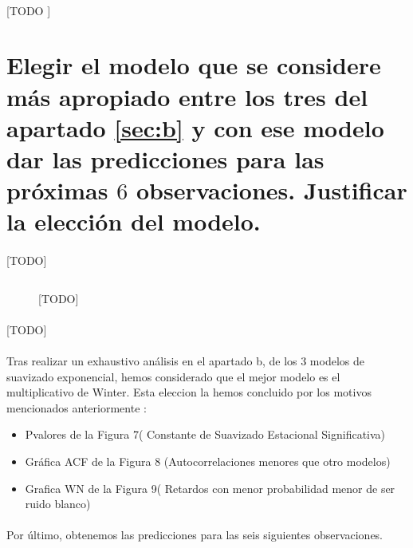 \documentclass[a4paper, spanish]{article}
\begin{document}
    \paragraph{}
    [TODO ]

  \section{Elegir el modelo que se considere más apropiado entre los tres del apartado \ref{sec:b} y con ese modelo dar las predicciones para las próximas $6$ observaciones. Justificar la elección del modelo.}
  \label{sec:c}

    \paragraph{}
    [TODO]

    \begin{figure}[h]
      \centering
      \inputminted{SAS}{./res/code/c-01-prediction.sas}
      \caption{[TODO]}
      \label{code:c_prediction}
    \end{figure}

    \paragraph{}
    [TODO]

    \paragraph{}
    Tras realizar un exhaustivo análisis en el apartado b, de los 3 modelos de suavizado exponencial, hemos considerado que el mejor modelo es el multiplicativo de Winter.
    Esta eleccion la hemos concluido por los motivos mencionados anteriormente :

    \begin{itemize}
      \item Pvalores de la Figura 7( Constante de Suavizado Estacional Significativa)
      \item Gráfica ACF de la Figura 8 (Autocorrelaciones menores que otro modelos)
      \item Grafica WN de la Figura 9( Retardos con menor probabilidad menor de ser ruido blanco)
    \end{itemize}

    \paragraph{}
    Por último, obtenemos las predicciones para las seis siguientes observaciones.
\end{document}
